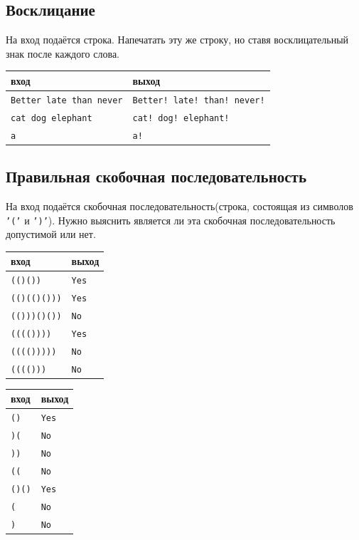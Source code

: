 \documentclass[10pt]{article}
\begin{document}
\subsection{Восклицание}
На вход подаётся строка. Напечатать эту же строку, но ставя восклицательный знак после каждого слова.
\begin{center}
\begin{tabular}{ l | l }
 вход & выход \\ \hline
 \texttt{Better late than never} & \texttt{Better! late! than! never!} \\
 \texttt{cat \quad dog elephant} & \texttt{cat! \quad dog! elephant!}  \\ 
 \texttt{a} & \texttt{a!} \\
\end{tabular}
\end{center}


\subsection{Правильная скобочная последовательность}
На вход подаётся скобочная последовательность(строка, состоящая из символов \texttt{'('} и \texttt{')'}). Нужно выяснить является ли эта скобочная последовательность допустимой или нет.
\begin{multicols}{2}
\begin{center}
\begin{tabular}{ l | l }
 вход & выход \\ \hline
 \texttt{(()())} & \texttt{Yes} \\
 \texttt{(()(()()))} & \texttt{Yes} \\
 \texttt{(()))()())} & \texttt{No} \\
 \texttt{(((())))} & \texttt{Yes} \\
 \texttt{(((()))))} & \texttt{No} \\
 \texttt{(((()))} & \texttt{No} \\
\end{tabular}
\end{center}

\begin{center}
\begin{tabular}{ l | l }
 вход & выход \\ \hline
 \texttt{()} & \texttt{Yes} \\
 \texttt{)(} & \texttt{No} \\
 \texttt{))} & \texttt{No} \\
 \texttt{((} & \texttt{No} \\
 \texttt{()()} & \texttt{Yes} \\
 \texttt{(} & \texttt{No} \\
 \texttt{)} & \texttt{No} \\
\end{tabular}
\end{center}
\end{multicols}
\end{document}
